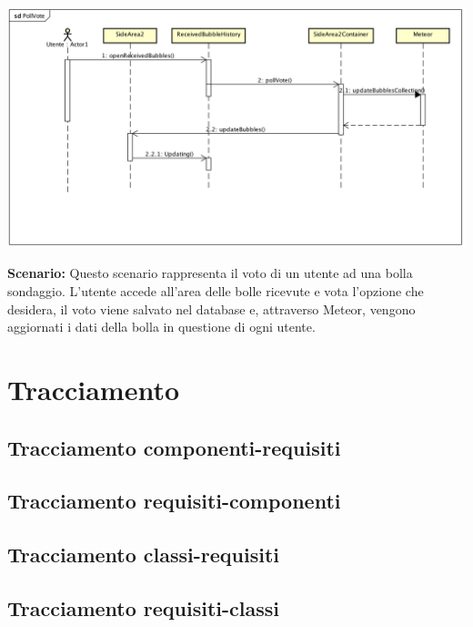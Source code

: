 \begin{center}
	\includegraphics[scale=0.4]{img/PollVote.png}
\end{center}



\textbf{Scenario:} 
Questo scenario rappresenta il voto di un utente ad una bolla sondaggio.
L’utente accede all’area delle bolle ricevute e vota l’opzione che desidera, il voto viene salvato 	nel database e, attraverso Meteor, vengono aggiornati i dati della bolla in questione di ogni 	utente. \\

\section{Tracciamento}

\subsection{Tracciamento componenti-requisiti}

\subsection{Tracciamento requisiti-componenti}


\subsection{Tracciamento classi-requisiti}

\subsection{Tracciamento requisiti-classi}





